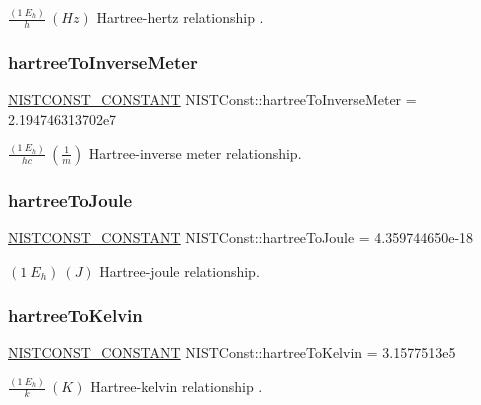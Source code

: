 $\frac{(1\ E_h)}{h} \ (Hz)$ Hartree-\/hertz relationship . \mbox{\label{group___n_i_s_t_const-_hartree_ga7b651bbca9217e235a1276cfdaac9d6e}} 
\subsubsection{\texorpdfstring{hartree\+To\+Inverse\+Meter}{hartreeToInverseMeter}}
{\footnotesize\ttfamily \mbox{\hyperlink{_n_i_s_t_const_8hpp_a2b0fc1d7452373f816175dd86ce26729}{N\+I\+S\+T\+C\+O\+N\+S\+T\+\_\+\+C\+O\+N\+S\+T\+A\+NT}} N\+I\+S\+T\+Const\+::hartree\+To\+Inverse\+Meter = 2.\+194746313702e7}

$\frac{(1\ E_h)}{hc} \ (\frac{1}{m})$ Hartree-\/inverse meter relationship. \mbox{\label{group___n_i_s_t_const-_hartree_ga477b51b8a0e743da7b56031105b4dd38}} 
\subsubsection{\texorpdfstring{hartree\+To\+Joule}{hartreeToJoule}}
{\footnotesize\ttfamily \mbox{\hyperlink{_n_i_s_t_const_8hpp_a2b0fc1d7452373f816175dd86ce26729}{N\+I\+S\+T\+C\+O\+N\+S\+T\+\_\+\+C\+O\+N\+S\+T\+A\+NT}} N\+I\+S\+T\+Const\+::hartree\+To\+Joule = 4.\+359744650e-\/18}

$(1\ E_h) \ (J)$ Hartree-\/joule relationship. \mbox{\label{group___n_i_s_t_const-_hartree_ga11349ff8dc3b4b39764521c290d59ec1}} 
\subsubsection{\texorpdfstring{hartree\+To\+Kelvin}{hartreeToKelvin}}
{\footnotesize\ttfamily \mbox{\hyperlink{_n_i_s_t_const_8hpp_a2b0fc1d7452373f816175dd86ce26729}{N\+I\+S\+T\+C\+O\+N\+S\+T\+\_\+\+C\+O\+N\+S\+T\+A\+NT}} N\+I\+S\+T\+Const\+::hartree\+To\+Kelvin = 3.\+1577513e5}

$\frac{(1\ E_h)}{k} \ (K)$ Hartree-\/kelvin relationship . \mbox{\label{group___n_i_s_t_const-_hartree_ga61c0da502aec40e97aaa90bbbaf8afb2}} 
